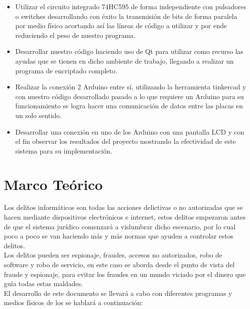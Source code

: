 \documentclass{article}
\begin{document}
\justifying
\begin{itemize}

    \item Utilizar el circuito integrado 74HC595 de forma independiente con pulsadores o switches desarrollando con éxito la transmisión de bits de forma paralela por medio físico acortando así las líneas de código a utilizar y por ende reduciendo el peso de nuestro programa.

    
    \item Desarrollar nuestro código haciendo uso de Qt para utilizar como recurso las ayudas que se tienen en dicho ambiente de trabajo, llegando a realizar un programa de encriptado completo.

    \item  Realizar la conexión 2 Arduino entre sí, utilizando la herramienta tinkercad y con nuestro código desarrollado pasado a lo que requiere un Arduino para su funcionamiento se logra hacer una comunicación de datos entre las placas en un solo sentido.


    \item Desarrollar una conexión en uno de los Arduino con una pantalla LCD y con el fin observar los resultados del proyecto mostrando la efectividad de este sistema para su implementación.

\end{itemize}

\newpage
\section{Marco Teórico}
\label{Marco Teórico}
Los delitos informáticos son todas las acciones delictivas o no autorizadas que se hacen mediante dispositivos electrónicos e internet, estos delitos empezaron antes de que el sistema jurídico comenzará a vislumbrar dicho escenario, por lo cual poco a poco se van haciendo más y más normas que ayuden a controlar estos delitos.\\
\newline
Los delitos pueden ser espionaje, fraudes, accesos no autorizados, robo de software y robo de servicio, en este caso se aborda desde el punto de vista del fraude y espionaje, para evitar los fraudes en un mundo viciado por el dinero que guía todas estas maldades.\\
\newline
El desarrollo de este documento se llevará a cabo con diferentes programas y medios físicos de los se hablará a continuación:\\
\end{document}
